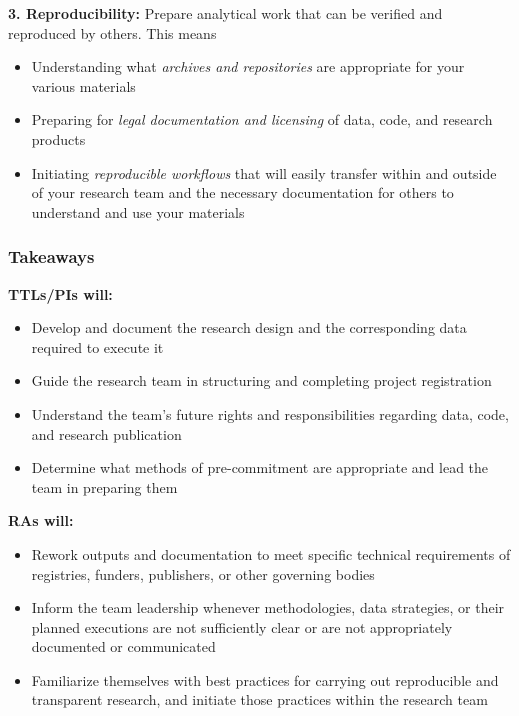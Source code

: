 \documentclass[
]{book}
\providecommand{\tightlist}{%
  \setlength{\itemsep}{0pt}\setlength{\parskip}{0pt}}
\begin{document}
\begin{summary}
\textbf{3. Reproducibility:} Prepare analytical work that can be verified and reproduced by others. This means

\begin{itemize}
\tightlist
\item
  Understanding what \emph{archives and repositories} are appropriate for your various materials
\item
  Preparing for \emph{legal documentation and licensing} of data, code, and research products
\item
  Initiating \emph{reproducible workflows} that will easily transfer within and outside of your research team and the necessary documentation for others to understand and use your materials
\end{itemize}

\hypertarget{takeaways}{%
\subsubsection*{Takeaways}\label{takeaways}}

\textbf{TTLs/PIs will:}

\begin{itemize}
\tightlist
\item
  Develop and document the research design and the corresponding data required to execute it
\item
  Guide the research team in structuring and completing project registration
\item
  Understand the team's future rights and responsibilities regarding data, code, and research publication
\item
  Determine what methods of pre-commitment are appropriate and lead the team in preparing them
\end{itemize}

\textbf{RAs will:}

\begin{itemize}
\tightlist
\item
  Rework outputs and documentation to meet specific technical requirements of registries, funders, publishers, or other governing bodies
\item
  Inform the team leadership whenever methodologies, data strategies, or their planned executions are not sufficiently clear or are not appropriately documented or communicated
\item
  Familiarize themselves with best practices for carrying out reproducible and transparent research, and initiate those practices within the research team
\end{itemize}


\end{summary}
\end{document}
